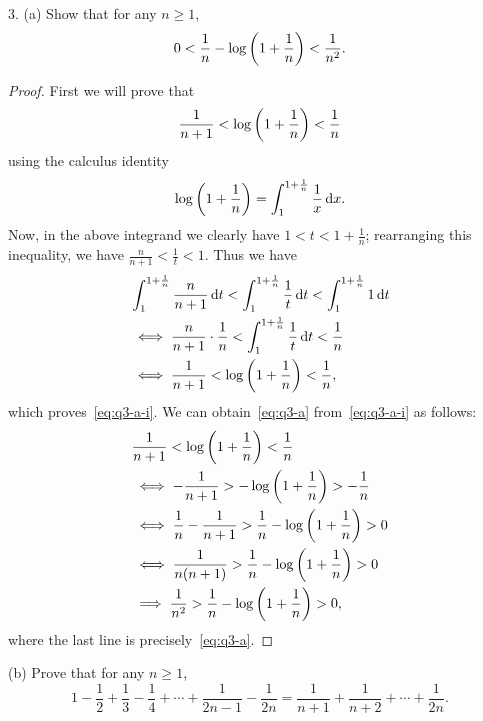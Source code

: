 \documentclass{article}
\begin{document}
\newpage

3. (a) Show that for any $n \geq 1$,
%
\begin{equation}
    0 < \frac{1}{n} - \log \del{1 + \frac{1}{n}} < \frac{1}{n^2}.
    \label{eq:q3-a}
\end{equation}

\begin{proof}

First we will prove that
%
\begin{equation}
    \frac{1}{n + 1} < \log\del{1 + \frac{1}{n}} < \frac{1}{n}
    \label{eq:q3-a-i}
\end{equation}
%
using the calculus identity
%
\begin{equation*}
    \log\del{1 + \frac{1}{n}} = \int_1^{1 + \frac{1}{n}} \frac{1}{x} \dif x
    .
\end{equation*}
%
Now, in the above integrand we clearly have $1 < t < 1 + \frac{1}{n}$;
rearranging this inequality, we have $\frac{n}{n + 1} < \frac{1}{t} < 1$.
Thus we have
%
\begin{align*}
    &
        \int_1^{1 + \frac{1}{n}} \frac{n}{n + 1} \dif t
        < \int_1^{1 + \frac{1}{n}} \frac{1}{t} \dif t
        < \int_1^{1 + \frac{1}{n}} 1 \dif t
        \\
    &\iff
        \frac{n}{n + 1} \cdot \frac{1}{n}
        < \int_1^{1 + \frac{1}{n}} \frac{1}{t} \dif t
        < \frac{1}{n}
        \\
    &\iff
        \frac{1}{n + 1}
        < \log\del{1 + \frac{1}{n}}
        < \frac{1}{n}
        ,
\end{align*}
%
which proves~\eqref{eq:q3-a-i}. We can obtain~\eqref{eq:q3-a}
from~\eqref{eq:q3-a-i} as follows:
%
\begin{align*}
    &\frac{1}{n + 1} < \log\del{1 + \frac{1}{n}} < \frac{1}{n} \\
    &\iff - \frac{1}{n + 1} > - \log\del{1 + \frac{1}{n}} > - \frac{1}{n} \\
    &\iff \frac{1}{n} - \frac{1}{n + 1} > \frac{1}{n} - \log\del{1 + \frac{1}{n}} > 0 \\
    &\iff \frac{1}{n (n + 1)} > \frac{1}{n} - \log\del{1 + \frac{1}{n}} > 0 \\
    &\implies \frac{1}{n^2} > \frac{1}{n} - \log\del{1 + \frac{1}{n}} > 0
    ,
\end{align*}
%
where the last line is precisely~\eqref{eq:q3-a}.

\end{proof}

(b) Prove that for any $n \geq 1$,
%
\begin{equation}
    1 - \frac{1}{2} + \frac{1}{3} - \frac{1}{4} + \cdots + \frac{1}{2 n - 1} - \frac{1}{2 n}
    = \frac{1}{n + 1} + \frac{1}{n + 2} + \cdots + \frac{1}{2 n}.
    \label{eq:q3-b}
\end{equation}
\end{document}
